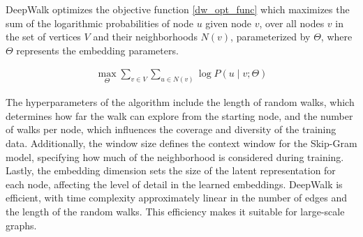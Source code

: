 DeepWalk optimizes the objective function \ref{dw_opt_func} 
which maximizes the sum of the logarithmic probabilities of node $u$ given node $v$, over all nodes $v$ in the set of vertices $V$ and their neighborhoods ${N(v)}$, parameterized by $\Theta$,
where  $\Theta$ represents the embedding parameters.


\begin{align}
\label{dw_opt_func}
\max_{\Theta} \sum_{v \in V} \sum_{u \in N(v)} \log P(u \mid v; \Theta)
\end{align}

The hyperparameters of the algorithm include the length of random walks, which determines how far the walk can explore from the starting node, and the number of walks per node, which influences the coverage and diversity of the training data. Additionally, the window size defines the context window for the Skip-Gram model, specifying how much of the neighborhood is considered during training. Lastly, the embedding dimension sets the size of the latent representation for each node, affecting the level of detail in the learned embeddings. DeepWalk is efficient, with time complexity approximately linear in the number of edges and the length of the random walks. This efficiency makes it suitable for large-scale graphs.

